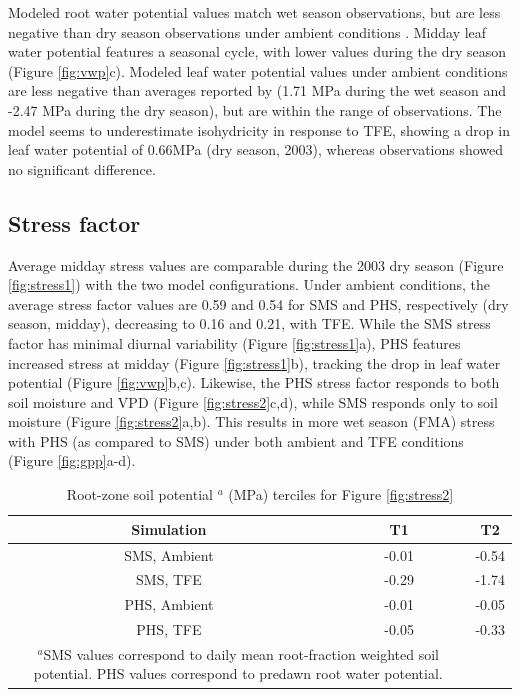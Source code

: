 \documentclass[draft,linenumbers]{agujournal}
\begin{document}
    Modeled root water potential values match wet season observations, but are less negative than dry season observations under ambient conditions \citep{fisher2006}.
    Midday leaf water potential features a seasonal cycle, with lower values during the dry season (Figure \ref{fig:vwp}c).
    Modeled leaf water potential values under ambient conditions are less negative than averages reported by \cite{fisher2006} (1.71 MPa during the wet season and -2.47 MPa during the dry season), but are within the range of observations.
    The model seems to underestimate isohydricity in response to TFE, showing a drop in leaf water potential of 0.66MPa (dry season, 2003), whereas observations showed no significant difference.


\subsection{Stress factor}
    
    Average midday stress values are comparable during the 2003 dry season (Figure \ref{fig:stress1}) with the two model configurations.
    Under ambient conditions, the average stress factor values are 0.59 and 0.54 for SMS and PHS, respectively (dry season, midday), 
    decreasing to 0.16 and 0.21, with TFE.
    While the SMS stress factor has minimal diurnal variability (Figure \ref{fig:stress1}a),
    PHS features increased stress at midday (Figure \ref{fig:stress1}b), tracking the drop in leaf water potential (Figure \ref{fig:vwp}b,c).
    Likewise, the PHS stress factor responds to both soil moisture and VPD (Figure \ref{fig:stress2}c,d), while SMS responds only to soil moisture (Figure \ref{fig:stress2}a,b).
    This results in more wet season (FMA) stress with PHS (as compared to SMS) under both ambient and TFE conditions (Figure \ref{fig:gpp}a-d).

\begin{table}
\caption{Root-zone soil potential $^a$ (MPa) terciles for Figure \ref{fig:stress2}}
\label{tab:tercile}
\centering
\begin{tabular}{c c c }
Simulation & T1 & T2 \\
\hline
SMS, Ambient & -0.01 & -0.54 \\
SMS, TFE & -0.29 & -1.74 \\
PHS, Ambient & -0.01 & -0.05 \\
PHS, TFE & -0.05 & -0.33 \\
\hline
\multicolumn{2}{p{.5\linewidth}}{$^{a}$SMS values correspond to daily mean root-fraction weighted soil potential.
PHS values correspond to predawn root water potential.}
\end{tabular}
\end{table}
\end{document}
